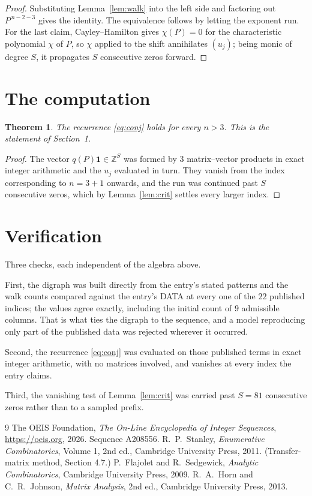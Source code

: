 \documentclass[11pt,a4paper]{article}
\theoremstyle{plain}
\newtheorem{theorem}{Theorem}
\theoremstyle{definition}
\begin{document}
\begin{proof}
Substituting Lemma~\ref{lem:walk} into the left side and factoring out
$P^{\,n-2-3}$ gives the identity. The equivalence follows by letting the exponent
run. For the last claim, Cayley--Hamilton gives $\chi(P)=0$ for the characteristic
polynomial $\chi$ of $P$, so $\chi$ applied to the shift annihilates $(u_j)$; being monic of
degree $S$, it propagates $S$ consecutive zeros forward.
\end{proof}

\section{The computation}

\begin{theorem}
The recurrence \eqref{eq:conj} holds for every $n>3$. This is the statement of
Section~1.
\end{theorem}

\begin{proof}
The vector $q(P)\mathbf{1}\in\mathbb{Z}^{S}$ was formed by $3$ matrix--vector
products in exact integer arithmetic and the $u_j$ evaluated in turn. They vanish from the
index corresponding to $n=3+1$ onwards, and the run was continued past $S$ consecutive
zeros, which by Lemma~\ref{lem:crit} settles every larger index.
\end{proof}

\section{Verification}

Three checks, each independent of the algebra above.

First, the digraph was built directly from the entry's stated patterns and the walk counts
compared against the entry's DATA at every one of the $22$ published indices; the
values agree exactly, including the initial count of $9$ admissible columns. That is
what ties the digraph to the sequence, and a model reproducing only part of the published
data was rejected wherever it occurred.

Second, the recurrence \eqref{eq:conj} was evaluated on those published terms in exact
integer arithmetic, with no matrices involved, and vanishes at every index the entry claims.

Third, the vanishing test of Lemma~\ref{lem:crit} was carried past $S=81$ consecutive
zeros rather than to a sampled prefix.

\begin{thebibliography}{9}
 The OEIS Foundation, \emph{The On-Line Encyclopedia of Integer
Sequences}, \url{https://oeis.org}, 2026. Sequence A208556.
 R.~P.~Stanley, \emph{Enumerative Combinatorics}, Volume 1, 2nd ed.,
Cambridge University Press, 2011. (Transfer-matrix method, Section 4.7.)
 P.~Flajolet and R.~Sedgewick, \emph{Analytic Combinatorics}, Cambridge
University Press, 2009.
 R.~A.~Horn and C.~R.~Johnson, \emph{Matrix Analysis}, 2nd ed., Cambridge
University Press, 2013.
\end{thebibliography}
\end{document}
